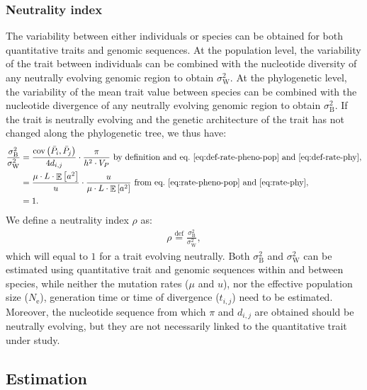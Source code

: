 \documentclass{article}
\newcommand{\defEqual}{\stackrel{\text{def}}{=}}
\newcommand{\Multiply}{\cdot}
\DeclareMathOperator{\E}{\mathbb{E}}
\DeclareMathOperator{\Cov}{\text{cov}}
\newcommand{\Ne}{N_{\text{e}}}
\newcommand{\Spi}{i}
\newcommand{\Spj}{j}
\newcommand{\NbrGen}{t_{\Spi, \Spj}}
\newcommand{\NucDiv}{d_{\Spi, \Spj}}
\newcommand{\Trait}{P}
\newcommand{\Heritability}{h^2}
\newcommand{\MeanTrait}{\bar{\Trait}}
\newcommand{\VarPhy}{\Cov \left( \MeanTrait_{\Spi}, \MeanTrait_{\Spj}\right)}
\newcommand{\MutationRatePheno}{\mu}
\newcommand{\MutationRateNuc}{u}
\newcommand{\NbrLoci}{L}
\newcommand{\VarPhenotype}{V_{\Trait}}
\newcommand{\GenArchi}{\NbrLoci \Multiply \E \left[ a^2 \right]}
\newcommand{\RateBetween}{\sigma^2_{\mathrm{B}}}
\newcommand{\RateWhithin}{\sigma^2_{\mathrm{W}}}
\newcommand{\NI}{\rho}
\begin{document}
\subsubsection*{Neutrality index}

The variability between either individuals or species can be obtained for both quantitative traits and genomic sequences.
At the population level, the variability of the trait between individuals can be combined with the nucleotide diversity of any neutrally evolving genomic region to obtain $\RateWhithin$.
At the phylogenetic level, the variability of the mean trait value between species can be combined with the nucleotide divergence of any neutrally evolving genomic region to obtain $\RateBetween$.
If the trait is neutrally evolving and the genetic architecture of the trait has not changed along the phylogenetic tree, we thus have:
\begin{align}
    \frac{\RateBetween}{\RateWhithin} &= \frac{\VarPhy}{4 \NucDiv} \Multiply \frac{\pi}{\Heritability \Multiply \VarPhenotype} \text{ by definition and eq.~\ref{eq:def-rate-pheno-pop} and~\ref{eq:def-rate-phy}},\\
    &= \frac{\MutationRatePheno \Multiply \GenArchi}{\MutationRateNuc} \Multiply \frac{\MutationRateNuc}{\MutationRatePheno \Multiply \GenArchi} \text{ from eq.~\ref{eq:rate-pheno-pop} and~\ref{eq:rate-phy}}, \\
    &= 1.
\end{align}
We define a neutrality index $\NI$ as:
\begin{align}
\NI \defEqual \frac{\RateBetween}{\RateWhithin},
\end{align}
 which will equal to $1$ for a trait evolving neutrally.
Both $\RateBetween$ and $\RateWhithin$ can be estimated using quantitative trait and genomic sequences within and between species, while neither the mutation rates ($\MutationRatePheno$ and $\MutationRateNuc$), nor the effective population size ($\Ne$), generation time or time of divergence ($\NbrGen$) need to be estimated.
Moreover, the nucleotide sequence from which $\pi$ and $\NucDiv$ are obtained should be neutrally evolving, but they are not necessarily linked to the quantitative trait under study.

\subsection*{Estimation}\label{subsec:estimate}
\end{document}
